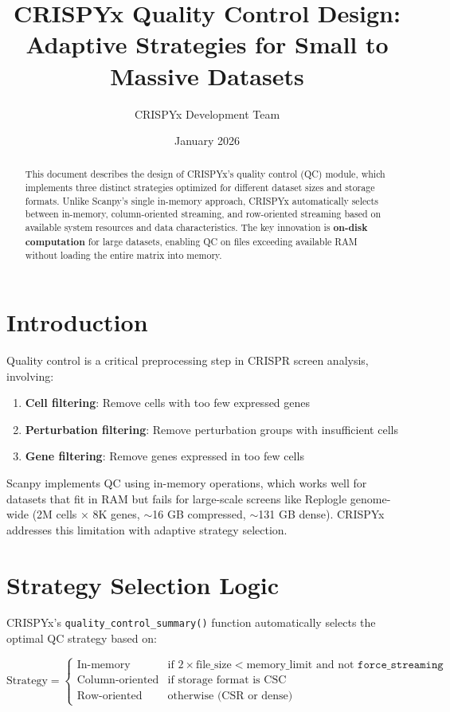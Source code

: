 \documentclass{article}
\title{CRISPYx Quality Control Design:\\
Adaptive Strategies for Small to Massive Datasets}
\author{CRISPYx Development Team}
\date{January 2026}
\begin{document}
\maketitle

\begin{abstract}
This document describes the design of CRISPYx's quality control (QC) module, which 
implements three distinct strategies optimized for different dataset sizes and storage 
formats. Unlike Scanpy's single in-memory approach, CRISPYx automatically selects between 
in-memory, column-oriented streaming, and row-oriented streaming based on available 
system resources and data characteristics. The key innovation is \textbf{on-disk 
computation} for large datasets, enabling QC on files exceeding available RAM without 
loading the entire matrix into memory.
\end{abstract}

\section{Introduction}

Quality control is a critical preprocessing step in CRISPR screen analysis, involving:
\begin{enumerate}
    \item \textbf{Cell filtering}: Remove cells with too few expressed genes
    \item \textbf{Perturbation filtering}: Remove perturbation groups with insufficient cells
    \item \textbf{Gene filtering}: Remove genes expressed in too few cells
\end{enumerate}

Scanpy implements QC using in-memory operations, which works well for datasets that fit 
in RAM but fails for large-scale screens like Replogle genome-wide (2M cells × 8K genes, 
$\sim$16 GB compressed, $\sim$131 GB dense). CRISPYx addresses this limitation with 
adaptive strategy selection.

\section{Strategy Selection Logic}

CRISPYx's \texttt{quality\_control\_summary()} function automatically selects the optimal 
QC strategy based on:

\begin{equation}
\text{Strategy} = 
\begin{cases}
\text{In-memory} & \text{if } 2 \times \text{file\_size} < \text{memory\_limit} \text{ and not } \texttt{force\_streaming} \\
\text{Column-oriented} & \text{if storage format is CSC} \\
\text{Row-oriented} & \text{otherwise (CSR or dense)}
\end{cases}
\end{equation}
\end{document}
